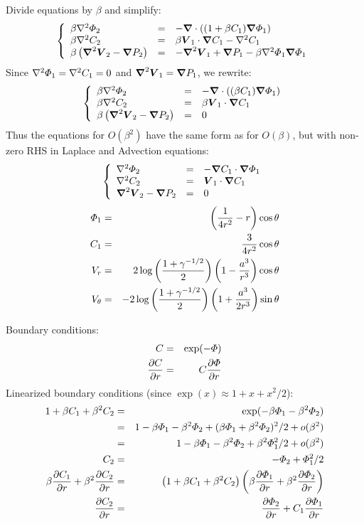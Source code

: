 Divide equations by $\beta$ and simplify:
\begin{eqnarray}
 \brc{lll}{
  \beta \Laplacian \varPhi_2 &=& - \bnabla \cdot \brcs{(1 + \beta C_1) \bnabla \varPhi_1}
  \\
  \beta \Laplacian C_2 &=& \beta \bV_1 \cdot \bnabla C_1 -\Laplacian C_1
  \\
  \beta\brcs{\bLaplacian \bV_2 - \bnabla P_2} &=& - \bLaplacian \bV_1 + \bnabla P_1 - \beta \Laplacian \varPhi_1 \bnabla \varPhi_1}
\end{eqnarray}
Since $\Laplacian\varPhi_1 = \Laplacian C_1 = 0$ and $\bLaplacian \bV_1 = \bnabla P_1$, we rewrite:
\begin{eqnarray}
 \brc{lll}{
  \beta \Laplacian \varPhi_2 &=& - \bnabla \cdot \brcs{(\beta C_1) \bnabla \varPhi_1}
  \\
  \beta \Laplacian C_2 &=& \beta \bV_1 \cdot \bnabla C_1
  \\
  \beta\brcs{\bLaplacian \bV_2 - \bnabla P_2} &=& 0
 }
\end{eqnarray}
Thus the equations for $O(\beta^2)$ have the same form as for $O(\beta)$, but with non-zero RHS in Laplace and Advection equations:
\begin{eqnarray}
 \brc{lll}{
  \Laplacian \varPhi_2 &=& -\bnabla C_1 \cdot \bnabla \varPhi_1
  \\
  \Laplacian C_2 &=& \bV_1 \cdot \bnabla C_1
  \\
  \bLaplacian \bV_2 - \bnabla P_2 &=& 0
 }
\end{eqnarray}
\begin{eqnarray}
  \varPhi_1 &=& \brcs{\frac{1}{4r^2} - r} \cos\theta \\
  C_1 &=&  \frac{3}{4r^2} \cos\theta \\
  V_r &=& 2 \log\brcs{\frac{1 + \gamma^{-1/2}}{2}} \brcs{1 - \frac{a^3}{r^3}} \cos\theta \\
  V_\theta &=& -2 \log\brcs{\frac{1 + \gamma^{-1/2}}{2}} \brcs{1 + \frac{a^3}{2r^3}} \sin\theta 
\end{eqnarray}

Boundary conditions:
\begin{eqnarray}
  C &=& \exp(-\varPhi) \\
  \deriv{C}{r} &=& C\deriv{\varPhi}{r}
\end{eqnarray}
Linearized boundary conditions (since $\exp(x) \approx 1 + x + x^2/2$):
\begin{eqnarray}
  1 + \beta C_1 + \beta^2 C_2  &=& \exp(-\beta \varPhi_1 - \beta^2 \varPhi_2) \\
  &=& 1 -\beta \varPhi_1 - \beta^2 \varPhi_2 + (\beta \varPhi_1 + \beta^2 \varPhi_2)^2/2 + o(\beta^2) \\
  &=& 1 -\beta \varPhi_1 - \beta^2 \varPhi_2 + \beta^2 \varPhi_1^2/2 + o(\beta^2) \\
  C_2 &=& -\varPhi_2 + \varPhi_1^2/2 \\
  \beta \deriv{C_1}{r} + \beta^2 \deriv{C_2}{r} &=& 
   \left(1 + \beta C_1 + \beta^2 C_2\right)\left(\beta \deriv{\varPhi_1}{r} + \beta^2 \deriv{\varPhi_2}{r}\right)   
   \\ \deriv{C_2}{r} &=& \deriv{\varPhi_2}{r} + C_1 \deriv{\varPhi_1}{r}
\end{eqnarray}

